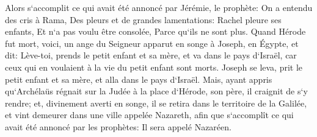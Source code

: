 \verse Alors s`accomplit ce qui avait été annoncé par Jérémie, le prophète: 
\verse On a entendu des cris à Rama, Des pleurs et de grandes lamentations: Rachel pleure ses enfants, Et n`a pas voulu être consolée, Parce qu`ils ne sont plus. 
\verse Quand Hérode fut mort, voici, un ange du Seigneur apparut en songe à Joseph, en Égypte, 
\verse et dit: Lève-toi, prends le petit enfant et sa mère, et va dans le pays d`Israël, car ceux qui en voulaient à la vie du petit enfant sont morts. 
\verse Joseph se leva, prit le petit enfant et sa mère, et alla dans le pays d`Israël. 
\verse Mais, ayant appris qu`Archélaüs régnait sur la Judée à la place d`Hérode, son père, il craignit de s`y rendre; et, divinement averti en songe, il se retira dans le territoire de la Galilée, 
\verse et vint demeurer dans une ville appelée Nazareth, afin que s`accomplît ce qui avait été annoncé par les prophètes: Il sera appelé Nazaréen. 

